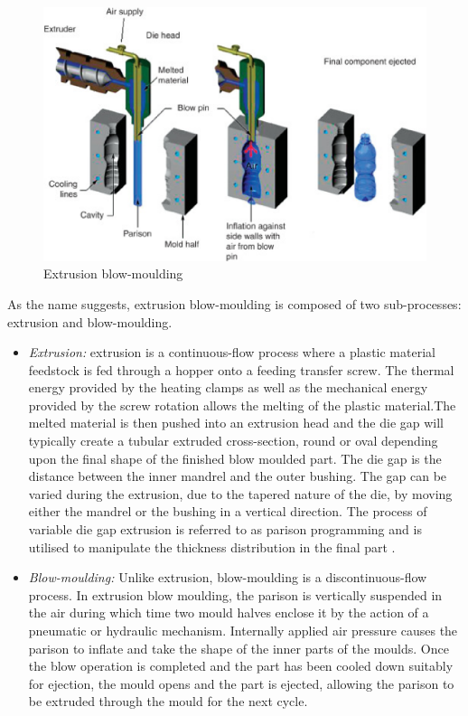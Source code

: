 \begin{figure}
\centerline{\includegraphics[scale=0.75]{images/chapter_1/extrusion_blow_molding.eps}}
\caption{Extrusion blow-moulding \citep{goodship2015design}}
\label{fig:Extrusion Blow-moulding}
\end{figure}

As the name suggests, extrusion blow-moulding is composed of two sub-processes: extrusion and blow-moulding.

\begin{itemize}
    \item \textit{Extrusion:} extrusion is a continuous-flow process where a plastic material feedstock is fed through a hopper onto a feeding transfer screw. The thermal energy provided by the heating clamps as well as the mechanical energy provided by the screw rotation allows the melting of the plastic material.The melted material is then pushed into an extrusion head and the die gap will typically create a tubular extruded cross-section, round or oval depending upon the final shape of the finished blow moulded part.
    The die gap is the distance between the inner mandrel and the outer bushing. The gap can be varied during the extrusion, due to the tapered nature of the die, by moving either the mandrel or the bushing in a vertical direction. The process of variable die gap extrusion is referred to as parison programming and is utilised to manipulate the thickness distribution in the final part \citep{diraddo1993profile}.
    \item \textit{Blow-moulding:} Unlike extrusion, blow-moulding is a discontinuous-flow process. In extrusion blow moulding, the parison is vertically suspended in the air during which time two mould halves enclose it by the action of a pneumatic or hydraulic mechanism. Internally applied air pressure causes the parison to inflate and take the shape of the inner parts of the moulds. Once the blow operation is completed and the part has been cooled down suitably for ejection, the mould opens and the part is ejected, allowing the parison to be extruded through the mould for the next cycle. 
\end{itemize}

